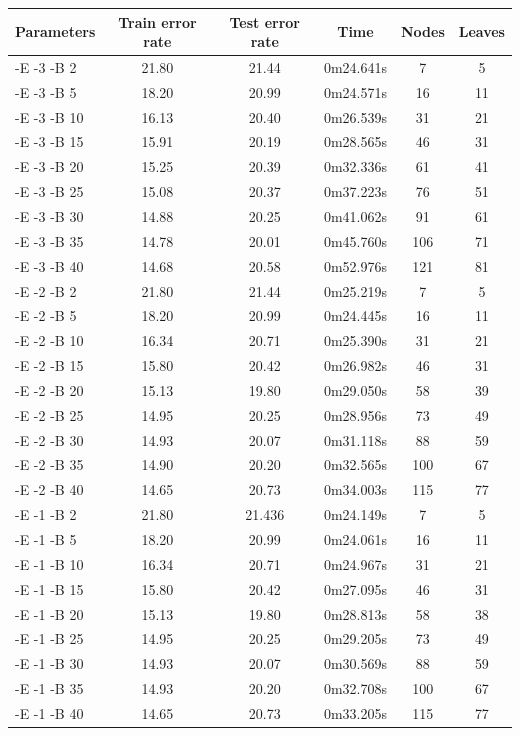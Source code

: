 \documentclass[a4paper]{llncs}
\begin{document}
\begin{table}[ht]
  \begin{center}
  \begin{tabular}{ | l | c | c | c | c | c |}
    \hline
    \textbf{Parameters} & \textbf{Train error rate} & \textbf{Test error rate} & \textbf{Time} & \textbf{Nodes} & \textbf{Leaves} \\ \hline
    -E -3 -B 2 & 21.80 & 21.44 & 0m24.641s & 7 & 5 \\ \hline
    -E -3 -B 5 & 18.20 & 20.99 & 0m24.571s & 16 & 11 \\ \hline
    -E -3 -B 10 & 16.13 & 20.40 & 0m26.539s & 31 & 21 \\ \hline
    -E -3 -B 15 & 15.91 & 20.19 & 0m28.565s & 46 & 31 \\ \hline
    -E -3 -B 20 & 15.25 & 20.39 & 0m32.336s & 61 & 41 \\ \hline
    -E -3 -B 25 & 15.08 & 20.37 & 0m37.223s & 76 & 51 \\ \hline
    -E -3 -B 30 & 14.88 & 20.25 & 0m41.062s & 91 & 61 \\ \hline
    -E -3 -B 35 & 14.78 & 20.01 & 0m45.760s & 106 & 71 \\ \hline
    -E -3 -B 40 & 14.68 & 20.58 & 0m52.976s & 121 & 81 \\ \hline
    
    -E -2 -B 2 & 21.80 & 21.44 & 0m25.219s & 7 & 5 \\ \hline
    -E -2 -B 5 & 18.20 & 20.99 & 0m24.445s & 16 & 11 \\ \hline
    -E -2 -B 10 & 16.34 & 20.71 & 0m25.390s & 31 & 21 \\ \hline
    -E -2 -B 15 & 15.80 & 20.42 & 0m26.982s & 46 & 31 \\ \hline
    -E -2 -B 20 & 15.13 & 19.80 & 0m29.050s & 58 & 39 \\ \hline
    -E -2 -B 25 & 14.95 & 20.25 & 0m28.956s & 73 & 49 \\ \hline
    -E -2 -B 30 & 14.93 & 20.07 & 0m31.118s & 88 & 59 \\ \hline
    -E -2 -B 35 & 14.90 & 20.20 & 0m32.565s & 100 & 67 \\ \hline
    -E -2 -B 40 & 14.65 & 20.73 & 0m34.003s & 115 & 77 \\ \hline
    
    -E -1 -B 2 & 21.80 & 21.436 & 0m24.149s & 7 & 5 \\ \hline
    -E -1 -B 5 & 18.20 & 20.99 & 0m24.061s & 16 & 11 \\ \hline
    -E -1 -B 10 & 16.34 & 20.71 & 0m24.967s & 31 & 21 \\ \hline
    -E -1 -B 15 & 15.80 & 20.42 & 0m27.095s & 46 & 31 \\ \hline
    -E -1 -B 20 & 15.13 & 19.80 & 0m28.813s & 58 & 38 \\ \hline
    -E -1 -B 25 & 14.95 & 20.25 & 0m29.205s & 73 & 49 \\ \hline
    -E -1 -B 30 & 14.93 & 20.07 & 0m30.569s & 88 & 59 \\ \hline
    -E -1 -B 35 & 14.93 & 20.20 & 0m32.708s & 100 & 67 \\ \hline
    -E -1 -B 40 & 14.65 & 20.73 & 0m33.205s & 115 & 77 \\ \hline
    

\end{tabular}
\end{center}
\end{table}
\end{document}
